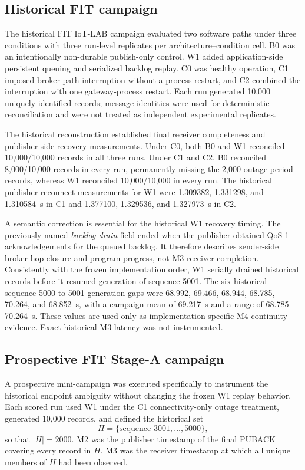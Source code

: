 \documentclass[journal]{IEEEtran}
\begin{document}
\subsection{Historical FIT campaign}

The historical FIT IoT-LAB campaign evaluated two software paths under three conditions with three run-level replicates per architecture--condition cell. B0 was an intentionally non-durable publish-only control. W1 added application-side persistent queuing and serialized backlog replay. C0 was healthy operation, C1 imposed broker-path interruption without a process restart, and C2 combined the interruption with one gateway-process restart. Each run generated 10,000 uniquely identified records; message identities were used for deterministic reconciliation and were not treated as independent experimental replicates.

The historical reconstruction established final receiver completeness and publisher-side recovery measurements. Under C0, both B0 and W1 reconciled 10,000/10,000 records in all three runs. Under C1 and C2, B0 reconciled 8,000/10,000 records in every run, permanently missing the 2,000 outage-period records, whereas W1 reconciled 10,000/10,000 in every run. The historical publisher reconnect measurements for W1 were 1.309382, 1.331298, and 1.310584~s in C1 and 1.377100, 1.329536, and 1.327973~s in C2.

A semantic correction is essential for the historical W1 recovery timing. The previously named \emph{backlog-drain} field ended when the publisher obtained QoS-1 acknowledgements for the queued backlog. It therefore describes sender-side broker-hop closure and program progress, not M3 receiver completion. Consistently with the frozen implementation order, W1 serially drained historical records before it resumed generation of sequence 5001. The six historical sequence-5000-to-5001 generation gaps were 68.992, 69.466, 68.944, 68.785, 70.264, and 68.852~s, with a campaign mean of 69.217~s and a range of 68.785--70.264~s. These values are used only as implementation-specific M4 continuity evidence. Exact historical M3 latency was not instrumented.

\subsection{Prospective FIT Stage-A campaign}

A prospective mini-campaign was executed specifically to instrument the historical endpoint ambiguity without changing the frozen W1 replay behavior. Each scored run used W1 under the C1 connectivity-only outage treatment, generated 10,000 records, and defined the historical set
\[
H=\{\text{sequence }3001,\ldots,5000\},
\]
so that $|H|=2000$. M2 was the publisher timestamp of the final PUBACK covering every record in $H$. M3 was the receiver timestamp at which all unique members of $H$ had been observed.
\end{document}
